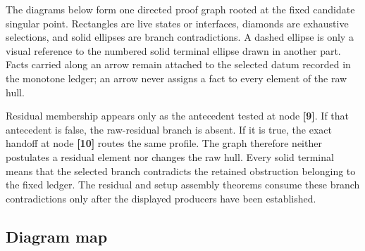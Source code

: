 \documentclass[11pt]{amsart}
\numberwithin{equation}{section}
\theoremstyle{plain}
\theoremstyle{definition}
\theoremstyle{remark}
\begin{document}
The diagrams below form one directed proof graph rooted at the fixed candidate
singular point.  Rectangles are live states or interfaces, diamonds are
exhaustive selections, and solid ellipses are branch contradictions.  A dashed
ellipse is only a visual reference to the numbered solid terminal ellipse
drawn in another part.  Facts carried along an arrow remain attached to the
selected datum recorded in the monotone ledger; an arrow never assigns a fact
to every element of the raw hull.

Residual membership appears only as the antecedent tested at node \textbf{[9]}.
If that antecedent is false, the raw-residual branch is absent.  If it is true,
the exact handoff at node \textbf{[10]} routes the same profile.  The graph
therefore neither postulates a residual element nor changes the raw hull.
Every solid terminal means that the selected branch contradicts the retained
obstruction belonging to the fixed ledger.  The residual and setup assembly
theorems consume these branch contradictions only after the displayed
producers have been established.

\subsection{Diagram map}
\end{document}
